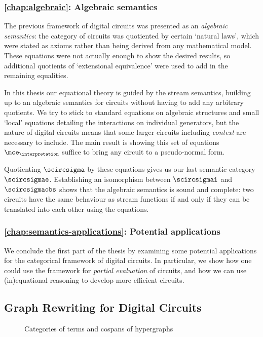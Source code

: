\subsubsection{\cref{chap:algebraic}: Algebraic semantics}

The previous framework of digital circuits was presented as an
\emph{algebraic semantics}: the category of circuits was quotiented by certain
`natural laws', which were stated as axioms rather than being derived from any
mathematical model.
These equations were not actually enough to show the desired results, so
additional quotients of `extensional equivalence' were used to add in the
remaining equalities.

In this thesis our equational theory is guided by the stream semantics,
building up to an algebraic semantics for circuits without having to add any
arbitrary quotients.
We try to stick to standard equations on algebraic structures and small `local'
equations detailing the interactions on individual generators, but the nature of
digital circuits means that some larger circuits including \emph{context} are
necessary to include.
The main result is showing this set of equations \(\mce_\interpretation\)
suffice to bring any circuit to a pseudo-normal form.

Quotienting \(\scircsigma\) by these equations gives us our last semantic
category \(\scircsigmae\).
Establishing an isomorphism between \(\scircsigmai\)
and \(\scircsigmaobs\) shows that the algebraic semantics is sound and complete:
two circuits have the same behaviour as stream functions if and only if they
can be translated into each other using the equations.

\subsubsection{\cref{chap:semantics-applications}: Potential applications}

We conclude the first part of the thesis by examining some potential
applications for the categorical framework of digital circuits.
In particular, we show how one could use the framework for
\emph{partial evaluation} of circuits, and how we can use (in)equational
reasoning to develop more efficient circuits.

\subsection{Graph Rewriting for Digital Circuits}

\begin{figure}
    \centering
    
    \caption{Categories of terms and cospans of hypergraphs}
    \label{fig:hypergraphs-map}
\end{figure}

